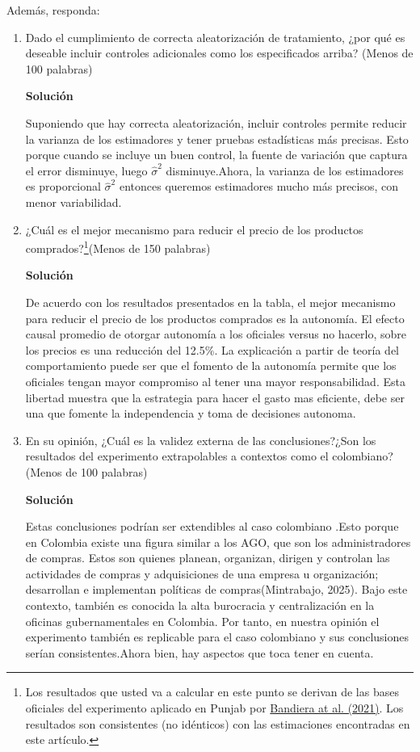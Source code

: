 \documentclass[a4paper, answers, addpoints, 11pt]{exam}
\newenvironment{solucion}{%
  \begin{mdframed}[
    backgroundcolor=blue!5,    %
    linecolor=blue!50,          %
    linewidth=2pt,              %
    leftmargin=10pt,            %
    rightmargin=8pt,           %
    topline=true,              %
    bottomline=true,            %
    roundcorner=10pt,           %
    innerleftmargin=10pt,       %
    innerrightmargin=10pt,      %
    innerbottommargin=10pt,     %
    innertopmargin=10pt         %
  ]%
  \begin{tcolorbox}[colframe=blue!50!black, colback=blue!50, coltitle=white, sharp corners=all, boxrule=1mm, width=\textwidth, halign=left, valign=center, top=0mm, bottom=0mm, left=0mm, right=0mm] \textbf{Solución} \end{tcolorbox} }{\end{mdframed}}
\begin{document}
\begin{enumerate}
    Además, responda:
   \begin{enumerate}
        \item Dado el cumplimiento de correcta aleatorización de tratamiento, ¿por qué es deseable incluir controles adicionales como los especificados arriba? (Menos de 100 palabras)
         \begin{solucion}
           Suponiendo que hay correcta aleatorización, incluir controles permite reducir la varianza de los estimadores y tener pruebas estadísticas más precisas. Esto porque cuando se incluye un buen control, la fuente de variación que captura el error disminuye, luego $\hat{\sigma}^2$ disminuye.Ahora, la varianza de los estimadores es proporcional  $\hat{\sigma}^2$ entonces queremos estimadores mucho más precisos, con menor variabilidad.
   \end{solucion}
       \item ¿Cuál es el mejor mecanismo para reducir el precio de los productos comprados?\footnote{\footnotesize{Los resultados que usted va a calcular en este punto se derivan de las bases oficiales del experimento aplicado en Punjab por \href{https://academic.oup.com/qje/article-abstract/136/4/2195/6354797?redirectedFrom=fulltext}{Bandiera at al. (2021)}. Los resultados son consistentes (no idénticos) con las estimaciones encontradas en este artículo.}}(Menos de 150 palabras)
       \begin{solucion}
           De acuerdo con los resultados presentados en la tabla, el mejor mecanismo para reducir el precio de los productos comprados es la autonomía.  El efecto causal promedio de otorgar autonomía a los oficiales versus no hacerlo, sobre los precios es una reducción del 12.5\%. La explicación a partir de teoría del comportamiento puede ser que el fomento de la autonomía permite que los oficiales tengan mayor compromiso al tener una mayor responsabilidad. Esta libertad muestra que la estrategia para hacer el gasto mas eficiente, debe ser una que fomente la independencia y toma de decisiones autonoma.
      \end{solucion}
     
       \item En su opinión, ¿Cuál es la validez externa de las conclusiones?¿Son los resultados del experimento extrapolables a contextos como el colombiano? (Menos de 100 palabras)
       \begin{solucion}
     Estas conclusiones podrían ser extendibles al caso colombiano .Esto porque en Colombia existe una figura similar a los AGO, que son los administradores de compras. Estos son quienes planean, organizan, dirigen y controlan las actividades de compras y adquisiciones de una empresa u organización; desarrollan e implementan políticas de compras(Mintrabajo, 2025). Bajo este contexto, también es conocida la alta burocracia y centralización en la oficinas gubernamentales en Colombia. 
    Por tanto, en nuestra opinión el experimento también es replicable para el caso colombiano y sus conclusiones serían consistentes.Ahora bien, hay aspectos que toca tener en cuenta.
    \end{solucion}
   \end{enumerate}
   

\end{enumerate}
\end{document}
